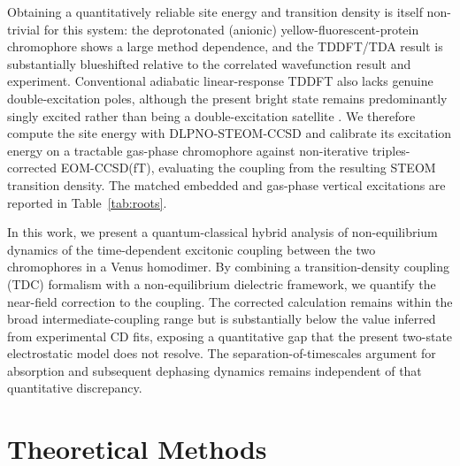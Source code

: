 \documentclass[journal=jpcbfk, manuscript=article, layout=twocolumn, doi=true]{achemso}
\begin{document}
Obtaining a quantitatively reliable site energy and transition density is itself non-trivial for this system: the deprotonated (anionic) yellow-fluorescent-protein chromophore shows a large method dependence, and the TDDFT/TDA result is substantially blueshifted relative to the correlated wavefunction result and experiment. Conventional adiabatic linear-response TDDFT also lacks genuine double-excitation poles, although the present bright state remains predominantly singly excited rather than being a double-excitation satellite \cite{maitra2004double}. We therefore compute the site energy with DLPNO-STEOM-CCSD and calibrate its excitation energy on a tractable gas-phase chromophore against non-iterative triples-corrected EOM-CCSD(fT), evaluating the coupling from the resulting STEOM transition density. The matched embedded and gas-phase vertical excitations are reported in Table~\ref{tab:roots}.

In this work, we present a quantum-classical hybrid analysis of non-equilibrium dynamics of the time-dependent excitonic coupling between the two chromophores in a Venus homodimer. By combining a transition-density coupling (TDC) formalism with a non-equilibrium dielectric framework, we quantify the near-field correction to the coupling. The corrected calculation remains within the broad intermediate-coupling range but is substantially below the value inferred from experimental CD fits, exposing a quantitative gap that the present two-state electrostatic model does not resolve. The separation-of-timescales argument for absorption and subsequent dephasing dynamics remains independent of that quantitative discrepancy.
\section{Theoretical Methods}
\end{document}
